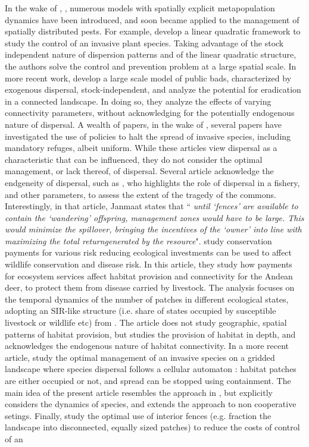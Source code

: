 In the wake of \cite{brown_metapopulation_1997}, \cite{bulte_metapopulation_1999}, \cite{sanchirico_bioeconomics_1999} numerous models with spatially explicit metapopulation dynamics have been introduced, and soon became applied to the management of spatially distributed pests. For example, \cite{blackwood_cost-effective_2010} develop a linear quadratic framework to study the control of an invasive plant species. Taking advantage of the stock independent nature of dispersion patterns and of the linear quadratic structure, the authors solve the control and prevention problem at a large spatial scale. In more recent work, \cite{costello_private_2017} develop a large scale model of public bads, characterized by exogenous dispersal, stock-independent, and analyze the potential for eradication in a connected landscape. In doing so, they analyze the effects of varying connectivity parameters, without acknowledging for the potentially endogenous nature of dispersal. A  wealth of papers, in the wake of \cite{sanchirico_bioeconomics_1999}, several papers \citep{albers_invasive_2010, ambec_regulation_2012} have investigated the use of policies to halt the spread of invasive species, including mandatory refuges, albeit uniform. While these articles view dispersal as a characteristic that can be influenced, they do not consider the optimal management, or lack thereof, of dispersal. Several article acknowledge the endgeneity of dispersal, such as \cite{janmaat_sharing_2005}, who highlights the role of dispersal in a fishery, and other parameters, to assess the extent of the tragedy of the commons. Interestingly, in that article, Janmaat states that `` \textit{until ‘fences’ are available to contain the ‘wandering’ offspring, management zones would have to be large. This would minimize the spillover, bringing the incentives of the ‘owner’ into line with maximizing the total returngenerated by the resource}". \cite{horan_wildlife_2008} study conservation payments for various risk reducing ecological investments can be used to affect wildlife conservation and disease risk. In this article, they study how payments for ecosystem services affect habitat provision and connectivity for the Andean deer, to protect them from disease carried by livestock. The analysis focuses on the temporal dynamics of the number of patches in different ecological states, adopting an SIR-like structure (i.e. share of states occupied by susceptible livestock or wildlife etc) from \cite{mccallum_disease_2002}. The article does not study geographic, spatial patterns of habitat provision, but studies the provision of habitat in depth, and acknowledges the endogenous nature of habitat connectivity. In a more recent article, \cite{Wilen2012} study the optimal management of an invasive species on a gridded landscape where species dispersal follows a cellular automaton : habitat patches are either occupied or not, and spread can be stopped using containment. The main idea of the present article resembles the approach in \cite{Wilen2012}, but explicitly considers the dynamics of species, and extends the approach to non cooperative setings. Finally, \cite{bode_interior_2013} study the optimal use of interior fences (e.g. fraction the landscape into disconnected, equally sized patches) to reduce the costs of control of an 